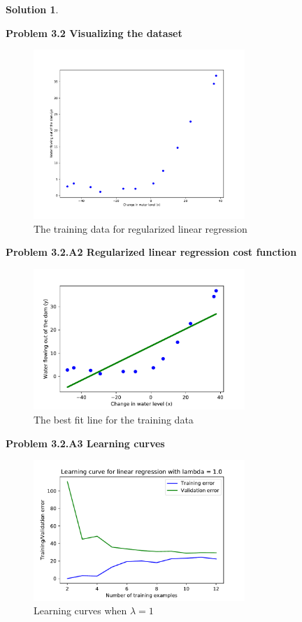 \documentclass[]{book}
\theoremstyle{definition}
\newtheorem*{soln}{Solution}
\begin{document}
\begin{enumerate}
\begin{soln}
	\end{soln}
	
\end{enumerate}
\textbf{Problem 3.2 Visualizing the dataset}
\begin{figure}[H]
	\centering
	\includegraphics[width=8cm]{fig6.pdf}
	\caption{The training data for regularized linear regression}
	\label{fig:6}
\end{figure}

\textbf{Problem 3.2.A2 Regularized linear regression cost function}
\begin{figure}[H]
	\centering
	\includegraphics[width=8cm]{fig7.pdf}
	\caption{The best fit line for the training data}
	\label{fig:7}
\end{figure}

\textbf{Problem 3.2.A3 Learning curves}


\begin{figure}[H]
	\centering
	\includegraphics[width=8cm]{fig8.pdf}
	\caption{Learning curves when $\lambda = 1$}
	\label{fig:8}
\end{figure}
\end{document}
